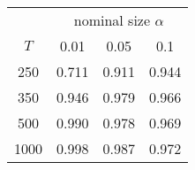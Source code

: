 % 
\begin{tabular}{cccc}
  \hline
  & \multicolumn{3}{c}{nominal size $\alpha$} \\
 $T$ & 0.01 & 0.05 & 0.1 \\
 \hline
250 & 0.711 & 0.911 & 0.944 \\ 
350 & 0.946 & 0.979 & 0.966 \\ 
  500 & 0.990 & 0.978 & 0.969 \\ 
  1000 & 0.998 & 0.987 & 0.972 \\ 
   \hline
\end{tabular}
